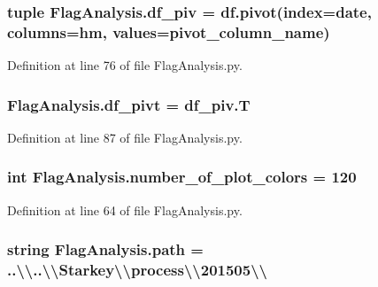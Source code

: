 \subsubsection[{df\+\_\+piv}]{\setlength{\rightskip}{0pt plus 5cm}tuple Flag\+Analysis.\+df\+\_\+piv = df.\+pivot(index=\textquotesingle{}date\textquotesingle{}, columns=\textquotesingle{}hm\textquotesingle{}, values={\bf pivot\+\_\+column\+\_\+name})}\label{namespace_flag_analysis_ae886d6e98de0bb5bb5a83e12ed72b924}


Definition at line 76 of file Flag\+Analysis.\+py.

\hypertarget{namespace_flag_analysis_a71e45af7a483a1647c8609f98d8b959e}{}
\subsubsection[{df\+\_\+pivt}]{\setlength{\rightskip}{0pt plus 5cm}Flag\+Analysis.\+df\+\_\+pivt = df\+\_\+piv.\+T}\label{namespace_flag_analysis_a71e45af7a483a1647c8609f98d8b959e}


Definition at line 87 of file Flag\+Analysis.\+py.

\hypertarget{namespace_flag_analysis_a2580a0126198e57e3b911e2e9005ce1e}{}
\subsubsection[{number\+\_\+of\+\_\+plot\+\_\+colors}]{\setlength{\rightskip}{0pt plus 5cm}int Flag\+Analysis.\+number\+\_\+of\+\_\+plot\+\_\+colors = 120}\label{namespace_flag_analysis_a2580a0126198e57e3b911e2e9005ce1e}


Definition at line 64 of file Flag\+Analysis.\+py.

\hypertarget{namespace_flag_analysis_a479e7d01bc47b2c854b2f33d7d8b2719}{}
\subsubsection[{path}]{\setlength{\rightskip}{0pt plus 5cm}string Flag\+Analysis.\+path = \textquotesingle{}..\textbackslash{}\textbackslash{}..\textbackslash{}\textbackslash{}Starkey\textbackslash{}\textbackslash{}process\textbackslash{}\textbackslash{}201505\textbackslash{}\textbackslash{}\textquotesingle{}}\label{namespace_flag_analysis_a479e7d01bc47b2c854b2f33d7d8b2719}


